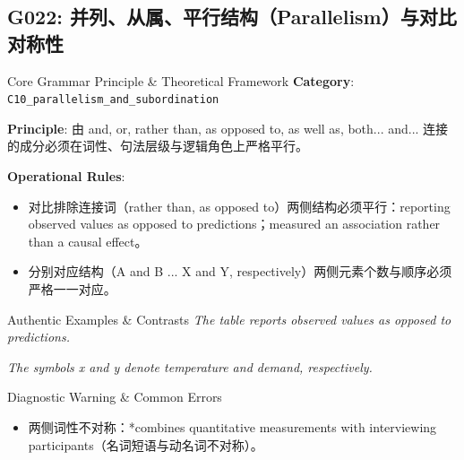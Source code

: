 \subsection{G022: 并列、从属、平行结构（Parallelism）与对比对称性}\label{sec:rule:G022}
\begin{ConceptBox}{Core Grammar Principle \& Theoretical Framework}
\textbf{Category}: \texttt{C10\_parallelism\_and\_subordination}\par\vspace{3pt}
\textbf{Principle}: 由 and, or, rather than, as opposed to, as well as, both... and... 连接的成分必须在词性、句法层级与逻辑角色上严格平行。\par\vspace{4pt}
\textbf{Operational Rules}:
\begin{itemize}[leftmargin=1.5em, itemsep=1pt]
  \item 对比排除连接词（rather than, as opposed to）两侧结构必须平行：reporting observed values as opposed to predictions；measured an association rather than a causal effect。
  \item 分别对应结构（A and B ... X and Y, respectively）两侧元素个数与顺序必须严格一一对应。
\end{itemize}
\end{ConceptBox}
\begin{ExampleBox}{Authentic Examples \& Contrasts}
\textit{The table reports observed values as opposed to predictions.}\par\vspace{2pt}
\textit{The symbols x and y denote temperature and demand, respectively.}\par\vspace{2pt}
\end{ExampleBox}
\begin{TipBox}{Diagnostic Warning \& Common Errors}
\begin{itemize}[leftmargin=1.5em, itemsep=1pt]
  \item 两侧词性不对称：*combines quantitative measurements with interviewing participants（名词短语与动名词不对称）。
\end{itemize}
\end{TipBox}
\vspace{6pt}
